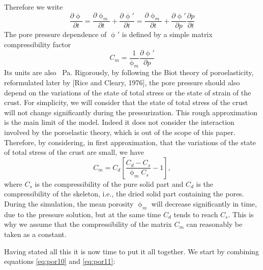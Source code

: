 Therefore we write
\begin{equation}
\frac{\partial \upphi}{\partial t}
=\frac{\partial \upphi_m}{\partial t} +\frac{\partial \upphi'}{\partial t}
=\frac{\partial \upphi_m}{\partial t} +\frac{\partial \upphi'}{\partial p} \frac{\partial p}{\partial t}
\label{eq:por25}
\end{equation}
The pore pressure dependence of $\upphi'$ is defined by a
simple matrix compressibility factor
\begin{equation}
C_m = \frac{1}{\upphi_m}\frac{\partial \upphi'}{\partial p}
\label{eq:por24}
\end{equation}
Its units are also \si{\per\pascal}.
Rigorously, by following the Biot theory of poroelasticity,
reformulated later by [Rice and Cleary, 1976], the pore
pressure should also depend on the variations of the state of
total stress or the state of strain of the crust. For simplicity,
we will consider that the state of total stress of the crust will
not change significantly during the pressurization. This
rough approximation is the main limit of the model. Indeed
it does not consider the interaction involved by the
poroelastic theory, which is out of the scope of this paper.
Therefore, by considering, in first approximation, that the
variations of the state of total stress of the crust are small,
we have 
\begin{equation}
C_m = C_d \left[ \frac{C_d - C_s}{\upphi_m C_s } - 1  \right],
\end{equation}
where $C_s$ is the compressibility of the pure solid part and $C_d$ is the
compressibility of the skeleton, i.e., the dried solid part
containing the pores. During the simulation, the mean
porosity $\upphi_m$ will decrease significantly in time, due to the
pressure solution, but at the same time $C_d$ tends to reach $C_s$.
This is why we assume that the compressibility of the
matrix $C_m$ can reasonably be taken as a constant. 

Having stated all this it is now time to put it all together.
We start by combining equations \eqref{eq:por10} and \eqref{eq:por11}:

